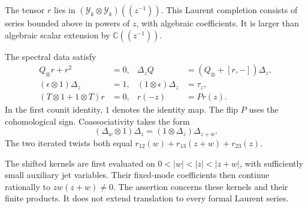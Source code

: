 The tensor $r$ lies in
$(\mathcal Y_k\otimes\mathcal Y_k)((z^{-1}))$.
This Laurent completion consists of series bounded above in powers
of $z$, with algebraic coefficients. It is larger than algebraic
scalar extension by $\mathbb C((z^{-1}))$.

\begin{theorem}\label{cylev:thm:line-spectral}
The spectral data satisfy
\begin{align}
 Q_\otimes r+r^2&=0,&
 \Delta_z Q&=(Q_\otimes+[r,-])\Delta_z,
          \label{cylev:eq:line-mc}\\
 (\epsilon\otimes1)\Delta_z&=1,&
 (1\otimes\epsilon)\Delta_z&=\tau_z,
          \label{cylev:eq:line-counit}\\
 (T\otimes1+1\otimes T)r&=0,&r(-z)&=P r(z).
          \label{cylev:eq:line-symmetry}
\end{align}
In the first counit identity, $1$ denotes the identity map.
The flip $P$ uses the cohomological sign.
Coassociativity takes the form
\[
 (\Delta_w\otimes1)\Delta_z=(1\otimes\Delta_z)\Delta_{z+w}.
\]
The two iterated twists both equal
$r_{12}(w)+r_{13}(z+w)+r_{23}(z)$.

The shifted kernels are first evaluated on
$0<|w|<|z|<|z+w|$, with sufficiently small auxiliary jet variables.
Their fixed-mode coefficients then continue rationally to
$zw(z+w)\ne0$.
The assertion concerns these kernels and their finite products.
It does not extend translation to every formal Laurent series.
\end{theorem}
